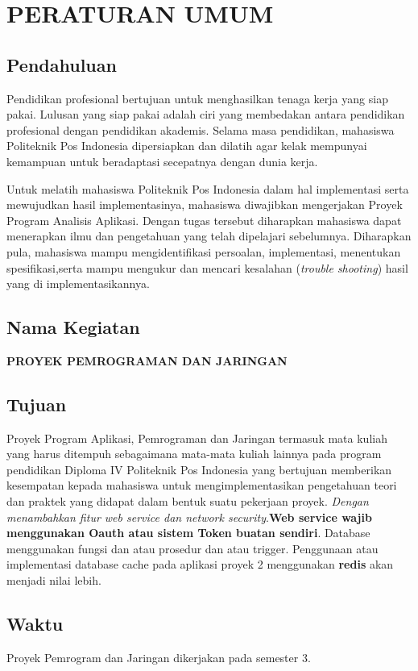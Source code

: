 \chapter{PERATURAN UMUM}
\section{Pendahuluan}
Pendidikan profesional bertujuan untuk menghasilkan tenaga kerja yang siap pakai. Lulusan yang siap pakai adalah ciri yang membedakan antara pendidikan profesional dengan pendidikan akademis. Selama masa pendidikan, mahasiswa Politeknik Pos Indonesia dipersiapkan dan dilatih agar kelak mempunyai kemampuan untuk beradaptasi secepatnya dengan dunia kerja.

Untuk melatih mahasiswa Politeknik Pos Indonesia dalam hal implementasi serta mewujudkan hasil implementasinya, mahasiswa diwajibkan mengerjakan Proyek Program Analisis Aplikasi. Dengan tugas tersebut diharapkan mahasiswa dapat menerapkan ilmu dan pengetahuan yang telah dipelajari sebelumnya. Diharapkan pula, mahasiswa mampu mengidentifikasi persoalan, implementasi, menentukan spesifikasi,serta mampu mengukur dan mencari kesalahan (\textit{trouble shooting}) hasil yang di implementasikannya.

\section{Nama Kegiatan}
\textbf{PROYEK PEMROGRAMAN DAN JARINGAN }

\section{Tujuan}
Proyek Program Aplikasi, Pemrograman dan Jaringan termasuk mata kuliah yang harus ditempuh sebagaimana mata-mata kuliah lainnya pada program pendidikan Diploma IV Politeknik Pos Indonesia yang bertujuan memberikan kesempatan kepada mahasiswa untuk mengimplementasikan pengetahuan teori dan praktek yang didapat dalam bentuk suatu pekerjaan proyek.\textit{ Dengan menambahkan fitur web service dan network security}.\textbf{Web service wajib menggunakan Oauth atau sistem Token buatan sendiri}. Database menggunakan fungsi dan atau prosedur dan atau trigger. Penggunaan atau implementasi database cache pada aplikasi proyek 2 menggunakan \textbf{redis} akan menjadi nilai lebih.

\section{Waktu}
Proyek Pemrogram dan Jaringan  dikerjakan pada semester 3.

